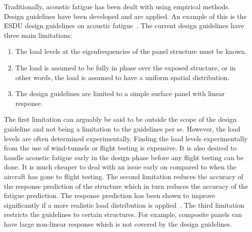 Traditionally, acoustic fatigue has been dealt with using empirical methods. Design guidelines have been developed and are applied. An example of this is the ESDU design guidelines on acoustic fatigue~\cite{ESDU}. The current design guidelines have three main limitations:
\begin{enumerate} \itemsep1pt \parskip0pt  \vspace{-5pt}
  \item\label{list:intro1} The load levels at the eigenfrequencies of the panel structure must be known.
  \item\label{list:intro2} The load is assumed to be fully in phase over the exposed structure, or in other words, the load is assumed to have a uniform spatial distribution.
  \item\label{list:intro3} The design guidelines are limited to a simple surface panel with linear response. 
\end{enumerate}
\vspace{-5pt}
The first limitation can arguably be said to be outside the scope of the design guideline and not being a limitation to the guidelines per se. However, the load levels are often determined experimentally. Finding the load levels experimentally from the use of wind-tunnels or flight testing is expensive. It is also desired to handle acoustic fatigue early in the design phase before any flight testing can be done. It is much cheaper to deal with an issue early on compared to when the aircraft has gone to flight testing. The second limitation reduces the accuracy of the response prediction of the structure which in turn reduces the accuracy of the fatigue prediction. The response prediction has been shown to improve significantly if a more realistic load distribution is applied~\cite{Campos,Cunnigham_exp2}. The third limitation restricts the guidelines to certain structures. For example, composite panels can have large non-linear response which is not covered by the design guidelines.

